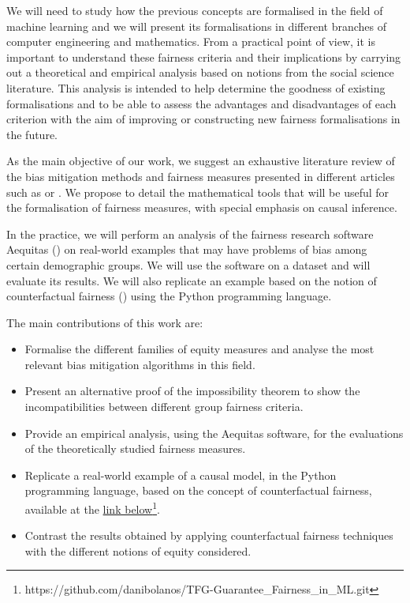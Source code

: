 We will need to study how the previous concepts are formalised in the field of machine learning and we will present its formalisations in different branches of computer engineering and mathematics. From a practical point of view, it is important to understand these fairness criteria and their implications by carrying out a theoretical and empirical analysis based on notions from the social science literature. This analysis is intended to help determine the goodness of existing formalisations and to be able to assess the advantages and disadvantages of each criterion with the aim of improving or constructing new fairness formalisations in the future. 

As the main objective of our work, we suggest an exhaustive literature review of the bias mitigation methods and fairness measures presented in different articles such as \cite{formalizing2018} or \cite{definitions2018}. We propose to detail the mathematical tools that will be useful for the formalisation of fairness measures, with special emphasis on causal inference.

In the practice, we will perform an analysis of the fairness research software Aequitas (\cite{aequitas2019}) on real-world examples that may have problems of bias among certain demographic groups. We will use the software on a dataset and will evaluate its results. We will also replicate an example based on the notion of counterfactual fairness (\cite{counterfactual2018}) using the Python programming language.

The main contributions of this work are:

\begin{itemize}
    \item Formalise the different families of equity measures and analyse the most relevant bias mitigation algorithms in this field.
    \item Present an alternative proof of the impossibility theorem to show the incompatibilities between different group fairness criteria.
    \item Provide an empirical analysis, using the Aequitas software, for the evaluations of the theoretically studied fairness measures.
    \item Replicate a real-world example of a causal model, in the Python programming language, based on the concept of counterfactual fairness, available at the \href{https://github.com/danibolanos/TFG-Guarantee_Fairness_in_ML.git}{link below}\footnote{https://github.com/danibolanos/TFG-Guarantee\_Fairness\_in\_ML.git}.
    \item Contrast the results obtained by applying counterfactual fairness techniques with the different notions of equity considered.
\end{itemize}


